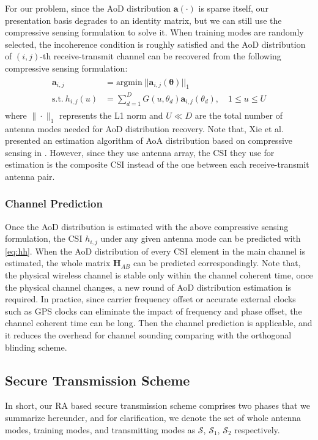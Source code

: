 For our problem, since the AoD distribution $\mathbf{a(\cdot)}$ is sparse itself, our presentation basis degrades to an identity matrix, but we can still use the compressive sensing formulation to solve it. When training modes are randomly selected, the incoherence condition is roughly satisfied and the AoD distribution of $(i,j)$-th receive-transmit channel can be recovered from the following compressive sensing formulation: 
\begin{align}
    \begin{split}
        \mathbf{a}_{i,j} & = \text{argmin}~||\mathbf{a}_{i,j}(\mathbf{\theta})||_1\\
        \text{s.t.}~ h_{i,j}(u) & = \sum\limits_{d = 1}^{D} G(u,\theta_d)\mathbf{a}_{i,j}(\theta_d), \quad 1\leq u \leq U
    \end{split}
\label{eq:CS_formulation}
\end{align}
where $\| \cdot \|_1$ represents the L1 norm and $U \ll D$ are the total number of antenna modes needed for AoD distribution recovery. Note that, Xie et al. presented an estimation algorithm of AoA distribution based on compressive sensing in \cite{xie2015hekaton}. However, since they use antenna array, the CSI they use for estimation is the composite CSI instead of the one between each receive-transmit antenna pair. 

\subsubsection{Channel Prediction}
Once the AoD distribution is estimated with the above compressive sensing formulation, the CSI $h_{i,j}$ under any given antenna mode can be predicted with  \eqref{eq:hh}. When the AoD distribution of every CSI element in the main channel is estimated, the whole matrix $\mathbf{H}_{AB}$ can be predicted correspondingly. Note that, the physical wireless channel is stable only within the channel coherent time, once the physical channel changes, a new round of AoD distribution estimation is required. In practice, since carrier frequency offset or accurate external clocks such as GPS clocks can eliminate the impact of frequency and phase offset, the channel coherent time can be long. Then the channel prediction is applicable, and it reduces the overhead for channel sounding comparing with the orthogonal blinding scheme.

\subsection{Secure Transmission Scheme}
In short, our RA based secure transmission scheme comprises two phases that we summarize hereunder, and for clarification, we denote the set of whole antenna modes, training modes, and transmitting modes as $\mathcal{S}$, $\mathcal{S}_1$, $\mathcal{S}_2$ respectively.

